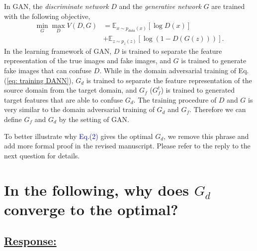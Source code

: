 In GAN, the \textit{discriminate network} $D$ and the \textit{generative network} $G$ are trained with the following objective,
\begin{equation}
    \label{eq: GAN}
    \begin{split}
        \min_G \max_D V(D,G) &= \mathbb{E}_{x\sim p_{data}(x)}[\log D(x)] \\ &+ \mathbb{E}_{z\sim p_z(z)}[\log (1-D(G(z)))].
    \end{split}
\end{equation}
In the learning framework of GAN, $D$ is trained to separate the feature representation of the true images and fake images, and $G$ is trained to generate fake images that can confuse $D$.
While in the domain adversarial training of Eq.(\ref{eq: training DANN}), $G_d$ is trained to separate the feature representation of the source domain from the target domain, and $G_f$ ($G_f^t$) is trained to generated target features that are able to confuse $G_d$.
The training procedure of $D$ and $G$ is very similar to the domain adversarial training of $G_d$ and $G_f$.
Therefore we can define $G_f$ and $G_d$ by the setting of GAN.

To better illustrate why \textcolor{blue}{Eq.(2)} gives the optimal $G_d$, we remove this phrase and add more formal proof in the revised manuscript.
Please refer to the reply to the next question for details.

\section{In the following, why does $G_d$ converge to the optimal?}
\subsection*{\underline{\textbf{Response:}}}

